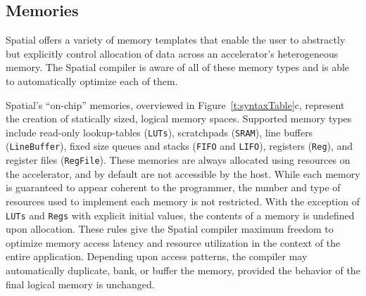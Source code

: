



\subsection{Memories}
Spatial offers a variety of memory templates that enable the user to abstractly but explicitly control allocation of data across an accelerator's heterogeneous memory.
The Spatial compiler is aware of all of these memory types and is able to automatically optimize each of them.

Spatial's ``on-chip'' memories, overviewed in Figure~\ref{t:syntaxTable}c, represent the creation of statically sized, logical memory spaces.
Supported memory types include read-only lookup-tables (\texttt{\small{LUTs}}), scratchpads (\texttt{\small{SRAM}}), line buffers (\texttt{\small{LineBuffer}}), fixed size queues and stacks (\texttt{\small{FIFO}} and \texttt{\small{LIFO}}),  registers (\texttt{\small{Reg}}), and register files (\texttt{\small{RegFile}}).
These memories are always allocated using resources on the accelerator, and by default are not accessible by the host.
While each memory is guaranteed to appear coherent to the programmer, the number and type of resources used to implement each memory is not restricted.
With the exception of \texttt{\small{LUTs}} and \texttt{\small{Regs}} with explicit initial values, the contents of a memory is undefined upon allocation.
These rules give the Spatial compiler maximum freedom to optimize memory access latency and resource utilization in the context of the entire application.
Depending upon access patterns, the compiler may automatically duplicate, bank, or buffer the memory, provided the behavior of the final logical memory is unchanged.

